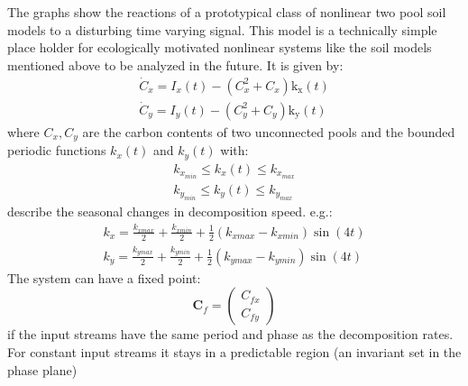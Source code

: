 
\begin{multicols}{2}
The graphs show the reactions of a prototypical class of nonlinear two pool soil models to a disturbing time varying signal. 
This model is a technically simple place holder for ecologically motivated nonlinear systems like the soil models mentioned above to be analyzed in the future. It is given by:\\
\begin{eqnarray}
\dot{C}_x=I_{x}(t)  - \left(C_{x}^{2} + C_{x}\right) \operatorname{k_{x}}{\left (t \right )}\\
\dot{C}_y=I_{y}(t)  - \left(C_{y}^{2} + C_{y}\right) \operatorname{k_{y}}{\left (t \right )}
\end{eqnarray}
where $C_x,C_y$ are the carbon contents of two unconnected pools and the bounded  periodic functions $k_x(t) $ and $k_y(t) $ with:\\ 
\begin{eqnarray}
k_{x_{min}}\le  k_x(t) \le k_{x_{max}} \\k_{y_{min}} \le  k_y(t) \le k_{y_{max}}
\end{eqnarray}
describe the seasonal changes in decomposition speed.
e.g.:\\ 
\begin{eqnarray}
k_x=\frac{k_{xmax}}{2} + \frac{k_{xmin}}{2} + \frac{1}{2} \left(k_{xmax} - k_{xmin}\right) \sin{\left (4 t \right )}\\k_y=\frac{k_{ymax}}{2} + \frac{k_{ymin}}{2} + \frac{1}{2} \left(k_{ymax} - k_{ymin}\right) \sin{\left (4 t \right )}
\end{eqnarray}
The system can have a fixed point: 
$$ \mathbf{C}_f= \begin{pmatrix} C_{fx} \\ C_{fy} \end{pmatrix} $$
if the input streams have the same period and phase as the decomposition rates. For constant input streams it stays in a predictable region (an invariant set in the phase plane) \\ 

\end{multicols}
